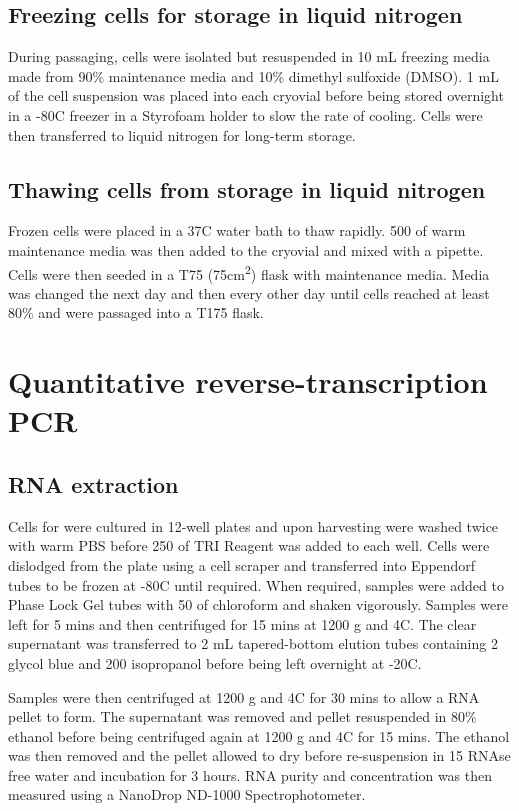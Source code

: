 \subsection{Freezing cells for storage in liquid nitrogen}

During passaging, cells were isolated but resuspended in 10 mL freezing media made from 90\% maintenance media and 10\% dimethyl sulfoxide (DMSO). 1 mL of the cell suspension was placed into each cryovial before being stored overnight in a -80\textdegree C freezer in a Styrofoam holder to slow the rate of cooling. Cells were then transferred to liquid nitrogen for long-term storage.  

\subsection{Thawing cells from storage in liquid nitrogen}

Frozen cells were placed in a 37\textdegree C water bath to thaw rapidly. 500 \uL of warm maintenance media was then added to the cryovial and mixed with a pipette. Cells were then seeded in a T75 (75cm\textsuperscript{2}) flask with maintenance media. Media was changed the next day and then every other day until cells reached at least 80\% and were passaged into a T175 flask.

\section {Quantitative reverse-transcription PCR}

\subsection{RNA extraction}

Cells for were cultured in 12-well plates and upon harvesting were washed twice with warm PBS before 250 \uL of TRI Reagent\textsuperscript{\textregistered}  was added to each well. Cells were dislodged from the plate using a cell scraper and transferred into Eppendorf tubes to be frozen at -80\textdegree C until required. When required, samples were added to Phase Lock Gel tubes with 50 \uL of chloroform and shaken vigorously. Samples were left for 5 mins and then centrifuged for 15 mins at 1200 g and 4\textdegree C. The clear supernatant was transferred to 2 mL tapered-bottom elution tubes containing 2 \uL glycol blue and 200 \uL isopropanol before being left overnight at -20\textdegree C. 

Samples were then centrifuged at 1200 g and 4\textdegree C for 30 mins to allow a RNA pellet to form. The supernatant was removed and pellet resuspended in 80\% ethanol before being centrifuged again at 1200 g and 4\textdegree C for 15 mins. The ethanol was then removed and the pellet allowed to dry before re-suspension in 15 \uL RNAse free water and incubation for 3 hours. RNA purity and concentration was then measured using a NanoDrop ND-1000 Spectrophotometer.

